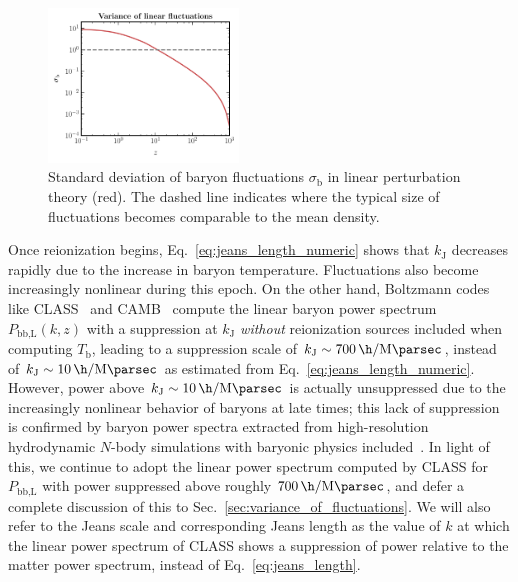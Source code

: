 \documentclass[prd,aps,10pt,nofootinbib,twocolumn,superscriptaddress,preprintnumbers,balancelastpage,longbibliography]{revtex4-1}
\begin{document}
%
\begin{figure}
    \centering
    \includegraphics[width=0.45\textwidth]{plots/sigma_lin_baryon.pdf}
    \caption{Standard deviation of baryon fluctuations $\sigma_\text{b}$ in linear perturbation theory (red). The dashed line indicates where the typical size of fluctuations becomes comparable to the mean density.~}
    \label{fig:sigma_lin_baryon}
\end{figure}
%

Once reionization begins, Eq.~\eqref{eq:jeans_length_numeric} shows that $k_\text{J}$ decreases rapidly due to the increase in baryon temperature.  
Fluctuations also become increasingly nonlinear during this epoch.
On the other hand, Boltzmann codes like CLASS~\cite{Blas:2011rf} and CAMB~\cite{Lewis:2007zh} compute the linear baryon power spectrum $P_\text{bb,L}(k,z)$ with a suppression at $k_\text{J}$ \textit{without} reionization sources included when computing $T_\text{b}$, leading to a suppression scale of $k_\text{J} \sim \SI{700}{\h\per\mega\parsec}$, instead of $k_\text{J} \sim \SI{10}{\h\per\mega\parsec}$ as estimated from Eq.~\eqref{eq:jeans_length_numeric}.     
However, power above $k_\text{J} \sim \SI{10}{\h\per\mega\parsec}$ is actually unsuppressed due to the increasingly nonlinear behavior of baryons at late times; this lack of suppression is confirmed by baryon power spectra extracted from high-resolution hydrodynamic $N$-body simulations with baryonic physics included~\cite{vanDaalen:2019pst}. 
In light of this, we continue to adopt the linear power spectrum computed by CLASS for $P_\text{bb,L}$ with power suppressed above roughly $\SI{700}{\h\per\mega\parsec}$, and defer a complete discussion of this to Sec.~\ref{sec:variance_of_fluctuations}. 
We will also refer to the Jeans scale and corresponding Jeans length as the value of $k$ at which the linear power spectrum of CLASS shows a suppression of power relative to the matter power spectrum, instead of Eq.~\eqref{eq:jeans_length}. 
\end{document}
